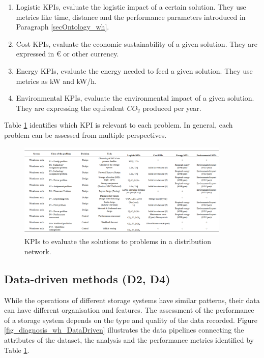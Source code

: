 \begin{enumerate}
    \item Logistic KPIs, evaluate the logistic impact of a certain solution. They use metrics like time, distance and the performance parameters introduced in Paragraph \ref{secOntology_wh}.
	\item Cost KPIs, evaluate the economic sustainability of a given solution. They are expressed in \euro{} or other currency.
	\item Energy KPIs, evaluate the energy needed to feed a given solution. They use metrics as kW and kW/h.
	\item Environmental KPIs, evaluate the environmental impact of a given solution. They are expressing the equivalent $CO_2$ produced per year.

\end{enumerate}

Table \ref{tab_kpis} identifies which KPI is relevant to each problem. In general, each problem can be assessed from multiple perspectives.

\begin{figure}[hbt!]
\centering
\includegraphics[width=0.9\textwidth]{SectionWarehouses/control_figures/tab_kpis.png}
\captionsetup{type=table}
\caption{KPIs to evaluate the solutions to problems in a distribution network.}
\label{tab_kpis}
\end{figure}

\subsection{Data-driven methods (D2, D4)} \label{secDataDrivenAnalysisWh}

While the operations of different storage systems have similar patterns, their data can have different organisation and features. The assessment of the performance of a storage system depends on the type and quality of the data recorded. Figure \ref{fig_diagnosis_wh_DataDriven} illustrates the data pipelines connecting the attributes of the dataset, the analysis and the performance metrics identified by Table \ref{tab_kpis}.

